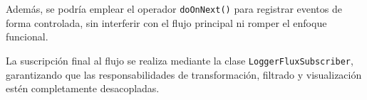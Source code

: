 Además, se podría emplear el operador \texttt{doOnNext()} para registrar eventos de forma controlada, sin interferir con el flujo principal ni romper el enfoque funcional.

La suscripción final al flujo se realiza mediante la clase \texttt{LoggerFluxSubscriber}, garantizando que las responsabilidades de transformación, filtrado y visualización estén completamente desacopladas.

